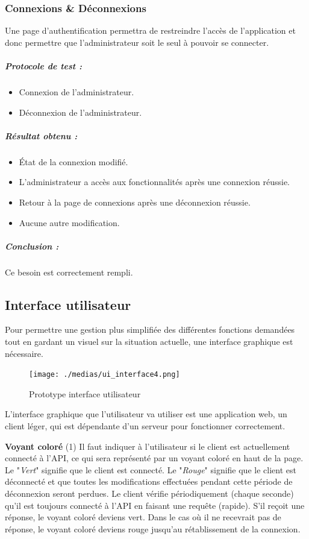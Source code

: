 \subsubsection{Connexions \& Déconnexions}
Une page d'authentification permettra de restreindre l'accès de l'application et donc permettre que l'administrateur soit le seul à pouvoir se connecter.
\subparagraph{Protocole de test :}
\begin{itemize}
    \item Connexion de l'administrateur.
    \item Déconnexion de l'administrateur.
\end{itemize}
\subparagraph{Résultat obtenu :}
    \begin{itemize}
    \item État de la connexion modifié.
    \item L'administrateur a accès aux fonctionnalités après une connexion réussie.
    \item Retour à la page de connexions après une déconnexion réussie.
    \item Aucune autre modification.
\end{itemize}
\subparagraph{Conclusion :}Ce besoin est correctement rempli.

\subsection{Interface utilisateur}
\label{sssec:ui}

Pour permettre une gestion plus simplifiée des différentes fonctions demandées tout en gardant un visuel sur la situation actuelle, une interface graphique est nécessaire. 

\begin{figure}[H]
    \texttt{[image: ./medias/ui\_interface4.png]}
    \caption{Prototype interface utilisateur}
    \label{fig:ui_interfaces}
\end{figure}

L'interface graphique que l'utilisateur va utiliser est une application web, un client léger, qui est dépendante d'un serveur pour fonctionner correctement.\newline

\textbf{Voyant coloré} (1)\newline
Il faut indiquer à l'utilisateur si le client est actuellement connecté à l'API, ce qui sera représenté par un voyant coloré en haut de la page. Le "\textit{Vert}" signifie que le client est connecté. Le "\textit{Rouge}" signifie que le client est déconnecté et que toutes les modifications effectuées pendant cette période de déconnexion seront perdues.
Le client vérifie périodiquement (chaque seconde) qu'il est toujours connecté à l'API en faisant une requête (rapide).
S'il reçoit une réponse, le voyant coloré deviens vert.
Dans le cas où il ne recevrait pas de réponse, le voyant coloré deviens rouge jusqu'au rétablissement de la connexion.\newline
 
